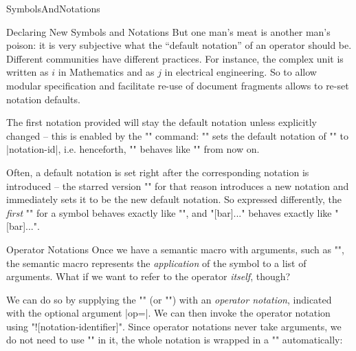 \begin{smodule}[ns=https://github.com/slatex/sTeX/doc]{SymbolsAndNotations}
\begin{sfragment}{Declaring New Symbols and Notations}
    But one man's meat is another man's poison: it is very subjective what the ``default
    notation'' of an operator should be. Different communities have different
    practices. For instance, the complex unit is written as $i$ in Mathematics and as $j$
    in electrical engineering. So to allow modular specification and facilitate re-use of
    document fragments \sTeX allows to re-set notation defaults.

    \begin{function}{\setnotation}
        The first notation provided will stay the default notation
        unless explicitly changed -- this is enabled by the 
        \stexcode"\setnotation" command:
        \stexcode"" sets the
        default notation of \stexcode"\symbolname" to |notation-id|,
        i.e. henceforth, \stexcode"\symbolname" behaves like
        \stexcode"\symbolname[notation-id]" from now on.
    \end{function}

    Often, a default notation is set right after the corresponding
    notation is introduced -- the starred version \stexcode"\notation*"
    for that reason introduces a new notation and immediately sets it
    to be the new default notation. So expressed differently,
    the \emph{first} \stexcode"\notation" for a symbol behaves
    exactly like \stexcode"\notation*", and 
    \stexcode"[bar]{...}" behaves exactly like
    \stexcode"[bar]{...}".
    
    \begin{sfragment}{Operator Notations}
        Once we have a semantic macro with arguments, such as
        \stexcode"\newbinarysymbol", the semantic macro
        represents the \emph{application} of the symbol
        to a list of arguments. What if we want to
        refer to the operator \emph{itself}, though?

        We can do so by supplying the \stexcode"\notation" (or
        \stexcode"\symdef") with an \emph{operator notation},
        indicated with the optional argument |op=|.
        We can then invoke the operator notation using
        \stexcode"\symbolname![notation-identifier]".
        Since operator notations never take arguments, we do not
        need to use \stexcode"\comp" in it, the whole notation is
        wrapped in a \stexcode"\comp" automatically:


\end{sfragment}
\end{sfragment}
\end{smodule}

